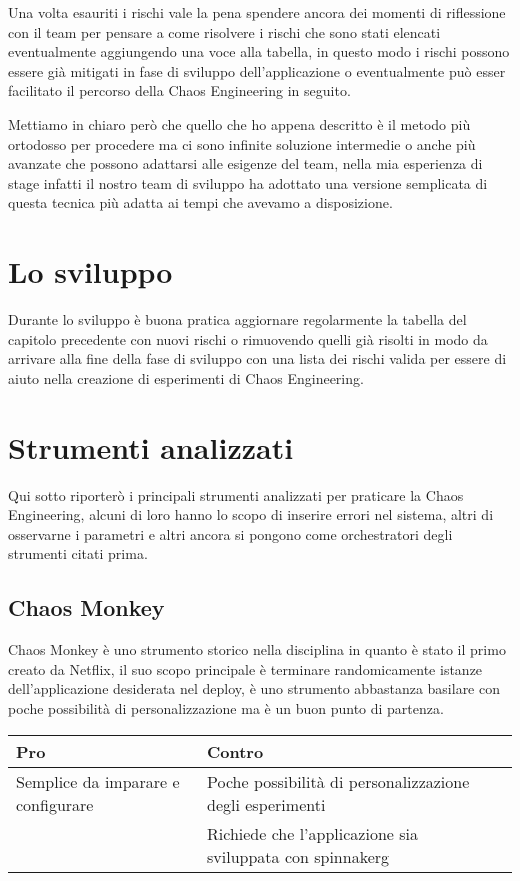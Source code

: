 Una volta esauriti i rischi vale la pena spendere ancora dei momenti di riflessione con il team per pensare a come risolvere i rischi che sono stati elencati eventualmente aggiungendo una voce alla tabella, in questo modo i rischi possono essere già mitigati in fase di sviluppo dell'applicazione o eventualmente può esser facilitato il percorso della Chaos Engineering in seguito.

Mettiamo in chiaro però che quello che ho appena descritto è il metodo più ortodosso per procedere ma ci sono infinite soluzione intermedie o anche più avanzate che possono adattarsi alle esigenze del team, nella mia esperienza di stage infatti il nostro team di sviluppo ha adottato una versione semplicata di questa tecnica più adatta ai tempi che avevamo a disposizione.

\section{Lo sviluppo}
Durante lo sviluppo è buona pratica aggiornare regolarmente la tabella del capitolo precedente con nuovi rischi o rimuovendo quelli già risolti in modo da arrivare alla fine della fase di sviluppo con una lista dei rischi valida per essere di aiuto nella creazione di esperimenti di Chaos Engineering.

\section{Strumenti analizzati}
Qui sotto riporterò i principali strumenti analizzati per praticare la Chaos Engineering, alcuni di loro hanno lo scopo di inserire errori nel sistema, altri di osservarne i parametri e altri ancora si pongono come orchestratori degli strumenti citati prima.

\subsection{Chaos Monkey}
Chaos Monkey è uno strumento storico nella disciplina in quanto è stato il primo creato da Netflix, il suo scopo principale è terminare randomicamente istanze dell'applicazione desiderata nel deploy, è uno strumento abbastanza basilare con poche possibilità di personalizzazione ma è un buon punto di partenza.
\begin{center}%
    \label{tab:chaos-monkey}
    \begin{tabularx}{\textwidth}{lXl}
    \hline\hline
    \textbf{Pro} & \textbf{Contro}\\
    \hline
    Semplice da imparare e configurare & Poche possibilità di personalizzazione degli esperimenti \\
     & Richiede che l'applicazione sia sviluppata con \gls{spinnakerg} \\
    \hline
    \end{tabularx}
\end{center}%

